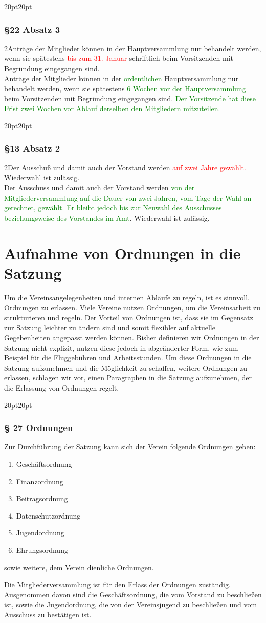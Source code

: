 \documentclass[10pt,a4paper,parskip=half]{scrartcl}
\newcommand{\new}[1]{\textcolor{Green}{#1}}
\newcommand{\old}[1]{\textcolor{Red}{#1}}
\newcommand{\change}[1]{
  \begin{adjustwidth}{20pt}{20pt}
    #1
  \end{adjustwidth}
}
\newcommand{\compare}[3]{\change{\subsubsection*{#1}\begin{multicols}{2}#2\columnbreak\\#3\end{multicols}}}
\begin{document}
\compare{§22 Absatz 3}{Anträge der Mitglieder können in der Haupt\-ver\-samm\-lung nur behandelt werden,
  wenn sie spätestens \old{bis zum 31. Januar} schriftlich beim Vorsitzenden mit Begründung eingegangen sind.}
{Anträge der Mitglieder können in der \new{ordentlichen} Haupt\-ver\-samm\-lung nur behandelt werden,
  wenn sie spätestens \new{6 Wochen vor der Hauptversammlung} beim Vorsitzenden mit Begründung eingegangen sind.
  \new{Der Vorsitzende hat diese Frist zwei Wochen vor Ablauf derselben den Mitgliedern mitzuteilen.}
}

\compare{§13 Absatz 2}
{Der Ausschuß und damit auch der Vorstand werden \old{auf zwei Jahre gewählt.}
  Wiederwahl ist zulässig.}
{Der Ausschuss und damit auch der Vorstand werden \new{von der Mitgliederversammlung auf die Dauer von zwei Jahren, vom Tage der Wahl an gerechnet, gewählt.
    Er bleibt jedoch bis zur Neuwahl des Ausschusses beziehungsweise des Vorstandes im Amt}.  Wiederwahl ist zulässig.}

\clearpage
\section{Aufnahme von Ordnungen in die Satzung}
\label{sec:ordnungen}
Um die Vereinsangelegenheiten und internen Abläufe zu regeln, ist es sinnvoll, Ordnungen zu erlassen. Viele Vereine nutzen Ordnungen, um die Vereinsarbeit zu strukturieren und regeln. Der Vorteil von Ordnungen ist, dass sie im Gegensatz zur Satzung leichter zu ändern sind und somit flexibler auf aktuelle Gegebenheiten angepasst werden können. Bisher definieren wir Ordnungen in der Satzung nicht explizit, nutzen diese jedoch in abgeänderter Form, wie zum Beispiel für die Fluggebühren und Arbeitsstunden. Um diese Ordnungen in die Satzung aufzunehmen und die Möglichkeit zu schaffen, weitere Ordnungen zu erlassen, schlagen wir vor, einen Paragraphen in die Satzung aufzunehmen, der die Erlassung von Ordnungen regelt.

\change{
  \subsubsection*{§ 27 Ordnungen}
  Zur Durchführung der Satzung kann sich der Verein folgende Ordnungen geben:
  \begin{enumerate}[label=\alph*),noitemsep]
    \item Geschäftsordnung
    \item Finanzordnung
    \item Beitragsordnung
    \item Datenschutzordnung
    \item Jugendordnung
    \item Ehrungsordnung
  \end{enumerate}
  sowie weitere, dem Verein dienliche Ordnungen.
  \todo[inline]{Straf- oder Disziplinarordnung}

  Die Mitgliederversammlung ist für den Erlass der Ordnungen zuständig.
  Ausgenommen davon sind die Geschäftsordnung,
  die vom Vorstand zu beschließen ist,
  sowie die Jugendordnung,
  die von der Vereinsjugend zu beschließen und vom Ausschuss zu bestätigen ist.

}
\end{document}
